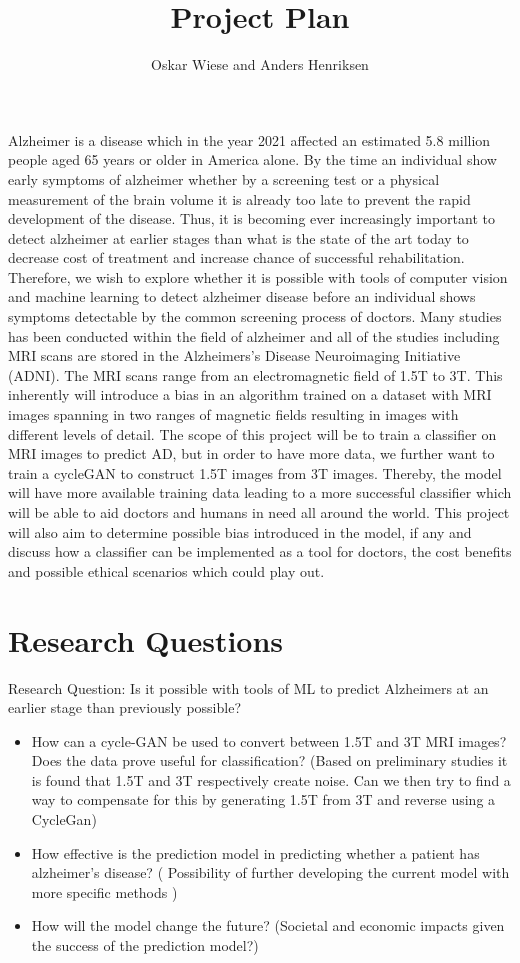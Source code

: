 \documentclass[]{article}
\title{Project Plan}
\author{Oskar Wiese and Anders Henriksen}
\begin{document}
\maketitle
\noindent
Alzheimer is a disease which in the year 2021 affected an estimated 5.8 million people aged 65 years or older in America alone.
By the time an individual show early symptoms of alzheimer whether by a screening test or a physical measurement of the brain volume it is already too late to prevent the rapid development of the disease. 
Thus, it is becoming ever increasingly important to detect alzheimer at earlier stages than what is the state of the art today to decrease cost of treatment and increase chance of successful rehabilitation.
Therefore, we wish to explore whether it is possible with tools of computer vision and machine learning to detect alzheimer disease before an individual shows symptoms detectable by the common screening process of doctors. 
Many studies has been conducted within the field of alzheimer and all of the studies including MRI scans are stored in the Alzheimers's Disease Neuroimaging Initiative (ADNI).
The MRI scans range from an electromagnetic field of 1.5T to 3T. 
This inherently will introduce a bias in an algorithm trained on a dataset with MRI images spanning in two ranges of magnetic fields resulting in images with different levels of detail.
The scope of this project will be to train a classifier on MRI images to predict AD, but in order to have more data, we further want to train a cycleGAN to construct 1.5T images from 3T images. 
Thereby, the model will have more available training data leading to a more successful classifier which will be able to aid doctors and humans in need all around the world.
This project will also aim to determine possible bias introduced in the model, if any and discuss how a classifier can be implemented as a tool for doctors, the cost benefits and possible ethical scenarios which could play out. 

\section{Research Questions}
Research Question: Is it possible with tools of ML to predict Alzheimers at an earlier stage than previously possible?
\begin{itemize}
	\item How can a cycle-GAN be used to convert between 1.5T and 3T MRI images? Does the data prove useful for classification? (Based on preliminary studies it is found that 1.5T and 3T respectively create noise. Can we then try to find a way to compensate for this by generating 1.5T from 3T and reverse using a CycleGan)
	\item How effective is the prediction model in predicting whether a patient has alzheimer's disease? ( Possibility of further developing the current model with more specific methods )
	\item How will the model change the future? (Societal and economic impacts given the success of the prediction model?)
\end{itemize}
\end{document}
